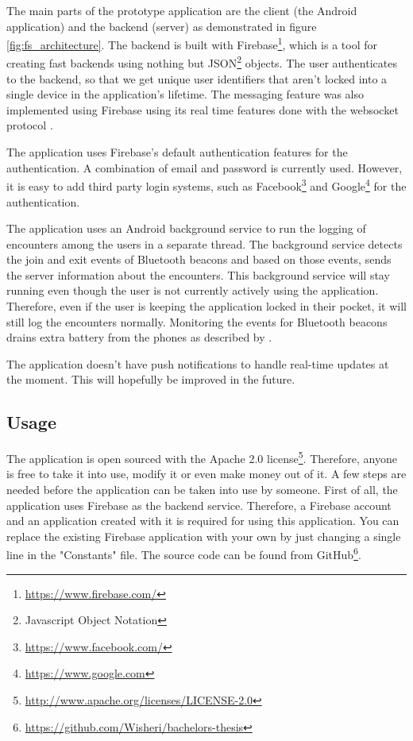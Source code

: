 The main parts of the prototype application are the client (the Android application) and the backend (server) as demonstrated in figure \ref{fig:fs_architecture}. The backend is built with Firebase\footnote{\url{https://www.firebase.com/}}, which is a tool for creating fast backends using nothing but JSON\footnote{Javascript Object Notation} objects. The user authenticates to the backend, so that we get unique user identifiers that aren't locked into a single device in the application's lifetime. The messaging feature was also implemented using Firebase using its real time features done with the websocket protocol \citep{rfc6455}.

The application uses Firebase's default authentication features for the authentication. A combination of email and password is currently used. However, it is easy to add third party login systems, such as Facebook\footnote{\url{https://www.facebook.com/}} and Google\footnote{\url{https://www.google.com}} for the authentication.

The application uses an Android background service to run the logging of encounters among the users in a separate thread. The background service detects the join and exit events of Bluetooth beacons and based on those events, sends the server information about the encounters. This background service will stay running even though the user is not currently actively using the application. Therefore, even if the user is keeping the application locked in their pocket, it will still log the encounters normally. Monitoring the events for Bluetooth beacons drains extra battery from the phones as described by \cite{bluetoothOverview}.

The application doesn't have push notifications to handle real-time updates at the moment. This will hopefully be improved in the future.

\subsection{Usage}

The application is open sourced with the Apache 2.0 license\footnote{\url{http://www.apache.org/licenses/LICENSE-2.0}}. Therefore, anyone is free to take it into use, modify it or even make money out of it. A few steps are needed before the application can be taken into use by someone. First of all, the application uses Firebase as the backend service. Therefore, a Firebase account and an application created with it is required for using this application. You can replace the existing Firebase application with your own by just changing a single line in the "Constants" file. The source code can be found from GitHub\footnote{\url{https://github.com/Wisheri/bachelors-thesis}}.
\clearpage


